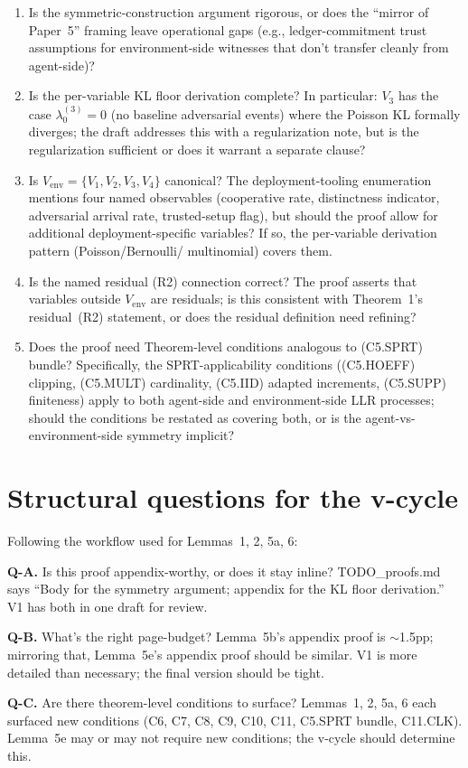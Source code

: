 \documentclass{article}
\begin{document}
\begin{enumerate}
\item Is the symmetric-construction argument rigorous, or does the
  ``mirror of Paper~5'' framing leave operational gaps (e.g.,
  ledger-commitment trust assumptions for environment-side
  witnesses that don't transfer cleanly from agent-side)?

\item Is the per-variable KL floor derivation complete?  In
  particular: $V_3$ has the case $\lambda_0^{(3)} = 0$ (no
  baseline adversarial events) where the Poisson KL formally
  diverges; the draft addresses this with a regularization note,
  but is the regularization sufficient or does it warrant a
  separate clause?

\item Is $V_{\mathrm{env}} = \{V_1, V_2, V_3, V_4\}$ canonical?
  The deployment-tooling enumeration mentions four named
  observables (cooperative rate, distinctness indicator,
  adversarial arrival rate, trusted-setup flag), but should the
  proof allow for additional deployment-specific variables?  If so,
  the per-variable derivation pattern (Poisson/Bernoulli/
  multinomial) covers them.

\item Is the named residual (R2) connection correct?  The proof
  asserts that variables outside $V_{\mathrm{env}}$ are residuals;
  is this consistent with Theorem~1's residual~(R2) statement, or
  does the residual definition need refining?

\item Does the proof need Theorem-level conditions analogous to
  (C5.SPRT) bundle?  Specifically, the SPRT-applicability
  conditions ((C5.HOEFF) clipping, (C5.MULT) cardinality, (C5.IID)
  adapted increments, (C5.SUPP) finiteness) apply to both
  agent-side and environment-side LLR processes; should the
  conditions be restated as covering both, or is the
  agent-vs-environment-side symmetry implicit?
\end{enumerate}

\section{Structural questions for the v-cycle}

Following the workflow used for Lemmas~1, 2, 5a, 6:

\textbf{Q-A.} Is this proof appendix-worthy, or does it stay
inline?  TODO\_proofs.md says ``Body for the symmetry argument;
appendix for the KL floor derivation.''  V1 has both in one
draft for review.

\textbf{Q-B.} What's the right page-budget?  Lemma~5b's appendix
proof is $\sim$1.5pp; mirroring that, Lemma~5e's appendix proof
should be similar.  V1 is more detailed than necessary; the final
version should be tight.

\textbf{Q-C.} Are there theorem-level conditions to surface?
Lemmas~1, 2, 5a, 6 each surfaced new conditions (C6, C7, C8, C9,
C10, C11, C5.SPRT bundle, C11.CLK).  Lemma~5e may or may not
require new conditions; the v-cycle should determine this.
\end{document}
